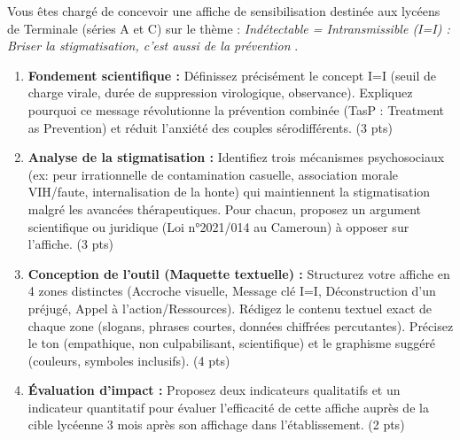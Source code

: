\documentclass[11pt]{article}
\begin{document}
\begin{exercice}
Vous êtes chargé de concevoir une affiche de sensibilisation destinée aux lycéens de Terminale (séries A et C) sur le thème : \og \textit{Indétectable = Intransmissible (I=I) : Briser la stigmatisation, c'est aussi de la prévention} \fg.
\begin{enumerate}
    \item \textbf{Fondement scientifique :} Définissez précisément le concept I=I (seuil de charge virale, durée de suppression virologique, observance). Expliquez pourquoi ce message révolutionne la prévention combinée (TasP : Treatment as Prevention) et réduit l'anxiété des couples sérodifférents. (3 pts)
    \item \textbf{Analyse de la stigmatisation :} Identifiez trois mécanismes psychosociaux (ex: peur irrationnelle de contamination casuelle, association morale VIH/\og faute\fg, internalisation de la honte) qui maintiennent la stigmatisation malgré les avancées thérapeutiques. Pour chacun, proposez un argument scientifique ou juridique (Loi n°2021/014 au Cameroun) à opposer sur l'affiche. (3 pts)
    \item \textbf{Conception de l'outil (Maquette textuelle) :} Structurez votre affiche en 4 zones distinctes (Accroche visuelle, Message clé I=I, Déconstruction d'un préjugé, Appel à l'action/Ressources). Rédigez le contenu textuel exact de chaque zone (slogans, phrases courtes, données chiffrées percutantes). Précisez le ton (empathique, non culpabilisant, scientifique) et le graphisme suggéré (couleurs, symboles inclusifs). (4 pts)
    \item \textbf{Évaluation d'impact :} Proposez deux indicateurs qualitatifs et un indicateur quantitatif pour évaluer l'efficacité de cette affiche auprès de la cible lycéenne 3 mois après son affichage dans l'établissement. (2 pts)
\end{enumerate}
\end{exercice}
\end{document}
